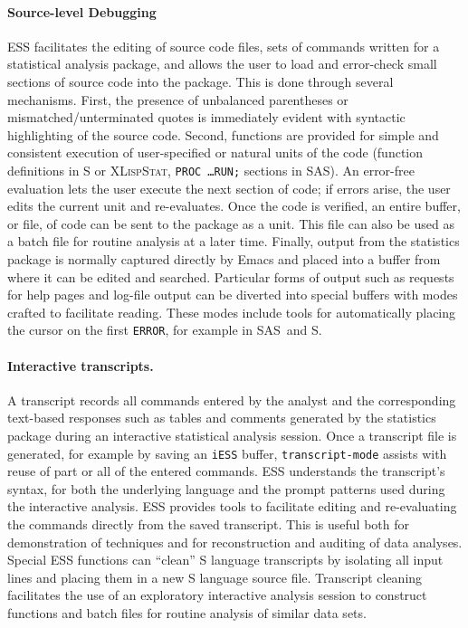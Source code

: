 \documentclass{article}
\newcommand*{\SAS}{\textsc{SAS}}
\newcommand*{\XLispStat}{\textsc{XLispStat}}
\newcommand{\stexttt}[1]{{\small\texttt{#1}}}
\begin{document}
\paragraph{Source-level Debugging}
ESS facilitates the editing of source code files, sets of commands
written for a statistical analysis package, and allows the user to
load and error-check small sections of source code into the package.
This is done through several mechanisms.  First, the presence of
unbalanced parentheses or mismatched/unterminated quotes is
immediately evident with syntactic highlighting of the source code.
Second, functions are provided for simple and consistent execution of
user-specified or natural units of the code (function definitions in S
or \XLispStat, \stexttt{PROC \dots RUN;} sections in \SAS).  An
error-free evaluation lets the user execute the next section of code;
if errors arise, the user edits the current unit and re-evaluates.
Once the code is verified, an entire buffer, or file, of code can be
sent to the package as a unit.  This file can also be used as a batch
file for routine analysis at a later time.  Finally, output from the
statistics package is normally captured directly by Emacs and placed
into a buffer from where it can be edited and searched.  Particular
forms of output such as requests for help pages and log-file output
can be diverted into special buffers with modes crafted to facilitate
reading.  These modes include tools for automatically placing the
cursor on the first \stexttt{ERROR}, for example in \SAS\ and S.

\paragraph{Interactive transcripts.}
A transcript records all commands entered by the analyst and the
corresponding text-based responses such as tables and comments
generated by the statistics package during an interactive statistical
analysis session.  Once a transcript file is generated, for example by
saving an \stexttt{iESS} buffer, \stexttt{transcript-mode} assists
with reuse of part or all of the entered commands.  ESS understands
the transcript's syntax, for both the underlying language and the
prompt patterns used during the interactive analysis.  ESS provides
tools to facilitate editing and re-evaluating the commands directly
from the saved transcript.  This is useful both for demonstration of
techniques and for reconstruction and auditing of data analyses.
Special ESS functions can ``clean'' S language transcripts by
isolating all input lines and placing them in a new S language source
file.  Transcript cleaning facilitates the use of an exploratory
interactive analysis session to construct functions and batch files
for routine analysis of similar data sets.
\end{document}
